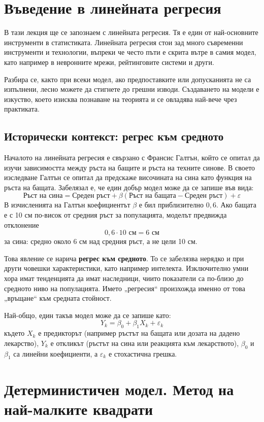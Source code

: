 \section{Въведение в линейната регресия}

В тази лекция ще се запознаем с линейната регресия. Тя е един от най-основните инструменти в статистиката. Линейната регресия стои зад много съвременни инструменти и технологии, въпреки че често пъти е скрита вътре в самия модел, като например в невронните мрежи, рейтинговите системи и други.

Разбира се, както при всеки модел, ако предпоставките или допусканията не са изпълнени, лесно можете да стигнете до грешни изводи. Създаването на модели е изкуство, което изисква познаване на теорията и се овладява най-вече чрез практиката.

\subsection{Исторически контекст: регрес към средното}
Началото на линейната регресия е свързано с Франсис Галтън, който се опитал да изучи зависимостта между ръста на бащите и ръста на техните синове. В своето изследване Галтън се опитал да предскаже височината на сина като функция на ръста на бащата. Забелязал е, че един добър модел може да се запише във вида:
\[
\text{Ръст на сина} = \text{Среден ръст} + \beta (\text{Ръст на бащата} - \text{Среден ръст}) + \varepsilon
\]
В изчисленията на Галтън коефициентът $\beta$ е бил приблизително $0{,}6$. Ако бащата е с 10 см по-висок от средния ръст за популацията, моделът предвижда отклонение
\[
0{,}6\cdot 10\text{ см}=6\text{ см}
\]
за сина: средно около 6 см над средния ръст, а не цели 10 см.

Това явление се нарича \textbf{регрес към средното}. То се забелязва нерядко и при други човешки характеристики, като например интелекта. Изключително умни хора имат тенденцията да имат наследници, чиито показатели са по-близо до средното ниво на популацията. Името „регресия“ произхожда именно от това „връщане“ към средната стойност.


Най-общо, един такъв модел може да се запише като:
\[
Y_k = \beta_0 + \beta_1 X_k + \varepsilon_k
\]
където $X_k$ е предикторът (например ръстът на бащата или дозата на дадено лекарство), $Y_k$ е откликът (ръстът на сина или реакцията към лекарството), $\beta_0$ и $\beta_1$ са линейни коефициенти, а $\varepsilon_k$ е стохастична грешка.

\section{Детерминистичен модел. Метод на най-малките квадрати}

